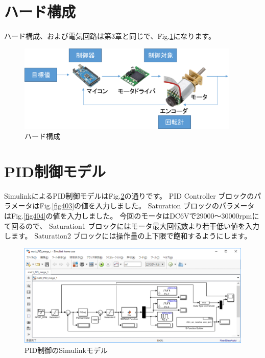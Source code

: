 \section{ハード構成}\label{ux5168ux4f53ux69cbux6211}

ハード構成、および電気回路は第3章と同じで、Fig.\ref{fig401}になります。

\begin{figure}[htbp]
    \centering
    \includegraphics[width=300pt]{fig/fig401.eps}
    \caption{ハード構成}
    \label{fig401}
\end{figure}


\section{PID制御モデル}\label{ux6a5fux4f53ux306eux72b6ux614bux3068ux30b5ux30a4ux30ba}

SimulinkによるPID制御モデルはFig.\ref{fig402}の通りです。
PID Controller ブロックのパラメータはFig.\ref{fig403}の値を入力しました。
Saturation ブロックのパラメータはFig.\ref{fig404}の値を入力しました。
今回のモータはDC6Vで29000～30000rpmにて回るので、
Saturation1 ブロックにはモータ最大回転数より若干低い値を入力します。
Saturation2 ブロックには操作量の上下限で飽和するようにします。

\begin{figure}[htbp]
    \centering
    \includegraphics[width=389pt]{fig/fig402.eps}
    \caption{PID制御のSimulinkモデル}
    \label{fig402}
\end{figure}

